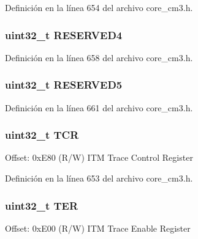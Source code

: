 Definición en la línea 654 del archivo core\+\_\+cm3.\+h.

\subsubsection[{\texorpdfstring{R\+E\+S\+E\+R\+V\+E\+D4}{RESERVED4}}]{\setlength{\rightskip}{0pt plus 5cm}uint32\+\_\+t R\+E\+S\+E\+R\+V\+E\+D4}\hypertarget{struct_i_t_m___type_a1f593ff98d0afd4a9f02de33304fe38d}{}\label{struct_i_t_m___type_a1f593ff98d0afd4a9f02de33304fe38d}


Definición en la línea 658 del archivo core\+\_\+cm3.\+h.

\subsubsection[{\texorpdfstring{R\+E\+S\+E\+R\+V\+E\+D5}{RESERVED5}}]{\setlength{\rightskip}{0pt plus 5cm}uint32\+\_\+t R\+E\+S\+E\+R\+V\+E\+D5}\hypertarget{struct_i_t_m___type_a2e4356b97fabed41bcbf29ec48cdb3de}{}\label{struct_i_t_m___type_a2e4356b97fabed41bcbf29ec48cdb3de}


Definición en la línea 661 del archivo core\+\_\+cm3.\+h.

\subsubsection[{\texorpdfstring{T\+CR}{TCR}}]{ uint32\+\_\+t T\+CR}\hypertarget{struct_i_t_m___type_ae9dd9282fab299d0cd6e119564688e53}{}\label{struct_i_t_m___type_ae9dd9282fab299d0cd6e119564688e53}
Offset\+: 0x\+E80 (R/W) I\+TM Trace Control Register 

Definición en la línea 653 del archivo core\+\_\+cm3.\+h.

\subsubsection[{\texorpdfstring{T\+ER}{TER}}]{ uint32\+\_\+t T\+ER}\hypertarget{struct_i_t_m___type_a8ffb3c6b706b03334f6fe37ef5d8b165}{}\label{struct_i_t_m___type_a8ffb3c6b706b03334f6fe37ef5d8b165}
Offset\+: 0x\+E00 (R/W) I\+TM Trace Enable Register 

